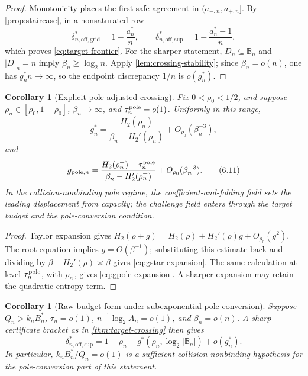 \documentclass[a4paper,11pt]{amsart}
\newtheorem{corollary}[theorem]{Corollary}
\theoremstyle{remark}
\newcommand{\B}{\mathbb B}
\newcommand{\abs}[1]{\lvert#1\rvert}
\begin{document}
\begin{proof}
Monotonicity places the first safe agreement in
\((a_{-,n},a_{+,n}]\).  By \cref{prop:staircase}, in a nonsaturated row
\[
 \delta_{n,\mathrm{off,grid}}^*=1-\frac{a_n^*}{n},
 \qquad
 \delta_{n,\mathrm{off,sup}}^*=1-\frac{a_n^*-1}{n},
\]
which proves \eqref{eq:target-frontier}.  For the sharper statement,
\(D_n\subseteq\B_n\) and \(\abs D_n=n\) imply
\(\beta_n\ge\log_2n\).  Apply \cref{lem:crossing-stability}; since
\(\beta_n=o(n)\), one has \(g_n^*n\to\infty\), so the endpoint discrepancy
\(1/n\) is \(o(g_n^*)\).
\end{proof}

\begin{corollary}[Explicit pole-adjusted crossing]\label{cor:crossing-expansion}
Fix \(0<\rho_0<1/2\), and suppose
\(\rho_n\in[\rho_0,1-\rho_0]\), \(\beta_n\to\infty\), and
\(\tau_n^{\rm pole}=o(1)\).  Uniformly in this range,
\[
 g_n^*=\frac{H_2(\rho_n)}
 {\beta_n-H_2'(\rho_n)}+O_{\rho_0}(\beta_n^{-3}),  \tag{6.10}\label{eq:gstar-expansion}
\]
and
\[
 g_{{\rm pole},n}=\frac{H_2(\rho_n^+)-\tau_n^{\rm pole}}
 {\beta_n-H_2'(\rho_n^+)}
 +O_{\rho_0}(\beta_n^{-3}).                        \tag{6.11}\label{eq:gpole-expansion}
\]
In the collision-nonbinding pole regime, the coefficient-and-folding
field sets the leading displacement from capacity; the challenge field
enters through the target budget and the pole-conversion condition.
\end{corollary}

\begin{proof}
Taylor expansion gives
\(H_2(\rho+g)=H_2(\rho)+H_2'(\rho)g+O_{\rho_0}(g^2)\).
The root equation implies \(g=O(\beta^{-1})\); substituting this estimate
back and dividing by \(\beta-H_2'(\rho)\asymp\beta\) gives
\eqref{eq:gstar-expansion}.  The same calculation at level
\(\tau_n^{\rm pole}\), with \(\rho_n^+\), gives
\eqref{eq:gpole-expansion}.  A sharper expansion may retain the quadratic
entropy term.
\end{proof}

\begin{corollary}[Raw-budget form under subexponential pole conversion]
\label{cor:raw-budget-form}
Suppose \(Q_n>k_nB_n^*\), \(\tau_n=o(1)\),
\(n^{-1}\log_2A_n=o(1)\), and \(\beta_n=o(n)\).  A sharp certificate bracket
as in \cref{thm:target-crossing} then gives
\[
 \delta_{n,\mathrm{off,sup}}^*
 =1-\rho_n-g^*(\rho_n,\log_2\abs{\B_n})+o(g_n^*). \tag{6.12}\label{eq:raw-budget-frontier}
\]
In particular, \(k_nB_n^*/Q_n=o(1)\) is a sufficient collision-nonbinding
hypothesis for the pole-conversion part of this statement.
\end{corollary}
\end{document}
